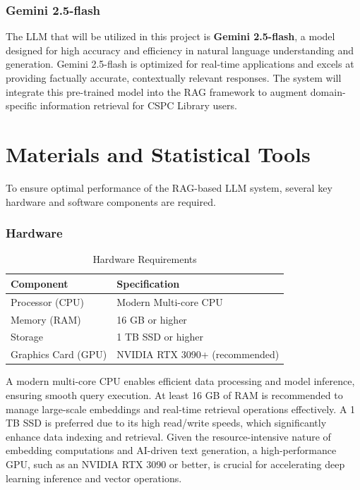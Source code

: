 \begin{refsection}
\subsubsection*{Gemini 2.5-flash}

The LLM that will be utilized in this project is \textbf{Gemini 2.5-flash}, a model designed for high accuracy and efficiency in natural language understanding and generation. Gemini 2.5-flash is optimized for real-time applications and excels at providing factually accurate, contextually relevant responses. The system will integrate this pre-trained model into the RAG framework to augment domain-specific information retrieval for CSPC Library users.

\section{Materials and Statistical Tools}

To ensure optimal performance of the RAG-based LLM system, several key hardware and software components are required.

\subsubsection*{Hardware}
\begin{table}[H]
    \centering
    \caption{Hardware Requirements}
    \label{tab:hardware_requirements}
    \begin{tabular}{ll}
        \hline
        \textbf{Component}       & \textbf{Specification}                     \\ \hline
        Processor (CPU)          & Modern Multi-core CPU                      \\
        Memory (RAM)             & 16 GB or higher                            \\
        Storage                  & 1 TB SSD or higher                         \\
        Graphics Card (GPU)      & NVIDIA RTX 3090+ (recommended)             \\
        \hline
    \end{tabular}
\end{table}

A modern multi-core CPU enables efficient data processing and model inference, ensuring smooth query execution. At least 16 GB of RAM is recommended to manage large-scale embeddings and real-time retrieval operations effectively. 
\newpage
\clearpage
A 1 TB SSD is preferred due to its high read/write speeds, which significantly enhance data indexing and retrieval. Given the resource-intensive nature of embedding computations and AI-driven text generation, a high-performance GPU, such as an NVIDIA RTX 3090 or better, is crucial for accelerating deep learning inference and vector operations.



\end{refsection}

